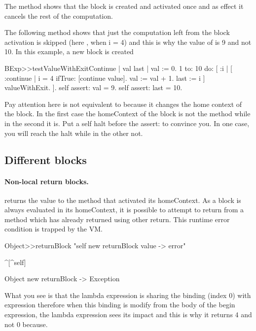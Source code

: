 \documentclass[a4paper,10pt,twoside]{book}
\begin{document}
The method  shows that the block  is created and activated once and as effect it cancels the rest of the computation. 

The following method  shows that just the computation left from the block activation is skipped (here , when i = 4) and this is why the value of  is 9 and not 10. 
In this example, a new block is created 


\begin{code}{}
BExp>>testValueWithExitContinue
	| val last |	
	val := 0. 
	1 to: 10 do: [ :i |
		[ :continue |
			i = 4 ifTrue: [continue value].
			val := val + 1.
			last := i
		] valueWithExit.
	].
	self assert: val = 9.
	self assert: last = 10.	
\end{code}

Pay attention here  is not equivalent to  because it changes the home context of the block. 
In the first case the homeContext of the block is not the method  while in the second it is.
Put a self halt before the assert: to convince you. In one case, you will reach the halt while in the other not. 





\subsection{Different blocks} 

\paragraph{Non-local return blocks.} \ct{[:x :y| x*x. ^ x + y]} returns the value to the method that activated its homeContext. As a block is always evaluated in its homeContext, it is possible to attempt to return from a method which has already returned using other return. This runtime error condition is trapped by the VM.

\begin{code}{}
Object>>returnBlock
	"self new returnBlock value -> error"

	^[^self]

Object new returnBlock
-> Exception
\end{code}	
	
	


What you see is that the lambda expression is sharing the binding (index 0) with expression 
therefore when this binding is modify from the body of the begin expression, the lambda expression sees its impact
and this is why it returns 4 and not 0 because. 
\end{document}
